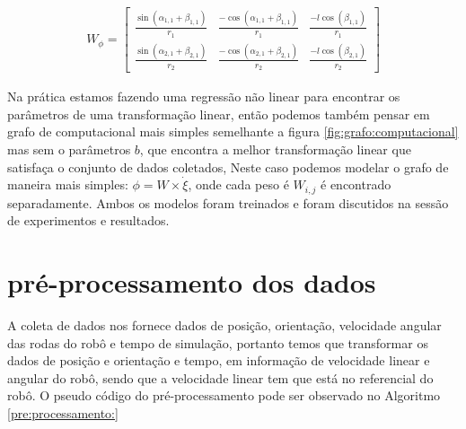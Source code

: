 \begin{align}
    W_{\phi} = 
    \begin{bmatrix}
        \frac{\sin(\alpha_{1,1} + \beta_{1,1})}{r_1} &  \frac{-\cos(\alpha_{1,1} + \beta_{1,1})}{r_1} & \frac{-l\cos(\beta_{1,1})}{r_1} \\
        \frac{\sin(\alpha_{2,1} + \beta_{2,1})}{r_2} &  \frac{-\cos(\alpha_{2,1} + \beta_{2,1})}{r_2} & \frac{-l\cos(\beta_{2,1})}{r_2}
    \end{bmatrix}
\end{align}

Na prática estamos fazendo uma regressão não linear para encontrar
os parâmetros de uma transformação linear, então podemos também pensar em
grafo de computacional mais simples semelhante a
figura \ref{fig:grafo:computacional} mas sem o parâmetros $b$, 
que encontra a melhor transformação
linear que satisfaça o conjunto de dados coletados,
Neste caso podemos modelar o grafo de maneira mais simples: $\phi=W \times \dot{\xi}$,
onde cada peso é $W_{i,j}$ é encontrado separadamente. Ambos os modelos foram
treinados e foram discutidos na sessão de experimentos e resultados.


\section{pré-processamento dos dados}
A coleta de dados nos fornece dados de posição, orientação, velocidade angular
das rodas do robô e tempo de simulação, portanto temos que transformar os dados
de posição e orientação e tempo, em informação de velocidade linear e angular
do robô, sendo que a velocidade linear tem que está no referencial do robô.
O pseudo código do pré-processamento pode ser observado no Algoritmo \ref{pre:processamento:}

